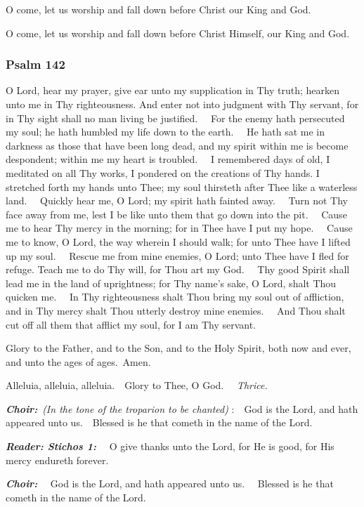 O come, let us worship and fall down before Christ our King and God.

O come, let us worship and fall down before Christ Himself, our King and God.

\subsubsection{Psalm 142}\label{psalm-142}

O Lord, hear my prayer, give ear unto my supplication in Thy truth; 
hearken unto me in Thy righteousness. And enter not into judgment with Thy servant, for in Thy sight shall no man living be justified.
~~For the enemy hath persecuted my soul; 
he hath humbled my life down to the earth.
~~He hath sat me in darkness as those that have been long dead, and my spirit within me is become despondent; 
within me my heart is troubled.
~~I remembered days of old, I meditated on all Thy works, I pondered on the creations of Thy hands. 
I stretched forth my hands unto Thee; my soul thirsteth after Thee like a waterless land.
~~Quickly hear me, O Lord; 
my spirit hath fainted away.
~~Turn not Thy face away from me, lest I be like unto them that go down into the pit.
~~Cause me to hear Thy mercy in the morning; 
for in Thee have I put my hope.
~~Cause me to know, O Lord, the way wherein I should walk; 
for unto Thee have I lifted up my soul.
~~Rescue me from mine enemies, O Lord; 
unto Thee have I fled for refuge. 
Teach me to do Thy will, for Thou art my God.
~~Thy good Spirit shall lead me in the land of uprightness; 
for Thy name's sake, O Lord, shalt Thou quicken me.
~~In Thy righteousness shalt Thou bring my soul out of affliction, and in Thy mercy shalt Thou utterly destroy mine enemies.
~~And Thou shalt cut off all them that afflict my soul, for I am Thy servant.

Glory to the Father, and to the Son, and to the Holy Spirit, both now and ever, and unto the ages of ages.~Amen.

Alleluia, alleluia, alleluia.~~Glory to Thee, O God.
~~\emph{Thrice.}

\textbf{\emph{Choir:}}~\emph{(In the tone of the troparion to be
chanted)}
:~~God is the Lord, and hath appeared unto us.~~Blessed is he that cometh in the name of the Lord.

\textbf{\emph{Reader: Stichos 1:}}
~~O give thanks unto the Lord, for He is good, for His mercy endureth forever.

\textbf{\emph{Choir:}}
~~God is the Lord, and hath appeared unto us.
~~Blessed is he that cometh in the name of the Lord.

